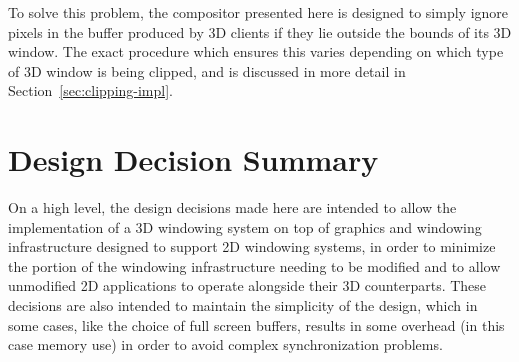 To solve this problem, the compositor presented here is designed to simply ignore pixels in the buffer produced by 3D clients if they lie outside the bounds of its 3D window. The exact procedure which ensures this varies depending on which type of 3D window is being clipped, and is discussed in more detail in Section~\ref{sec:clipping-impl}.

\section{Design Decision Summary}

On a high level, the design decisions made here are intended to allow the implementation of a 3D windowing system on top of graphics and windowing infrastructure designed to support 2D windowing systems, in order to minimize the portion of the windowing infrastructure needing to be modified and to allow unmodified 2D applications to operate alongside their 3D counterparts. These decisions are also intended to maintain the simplicity of the design, which in some cases, like the choice of full screen buffers, results in some overhead (in this case memory use) in order to avoid complex synchronization problems.  